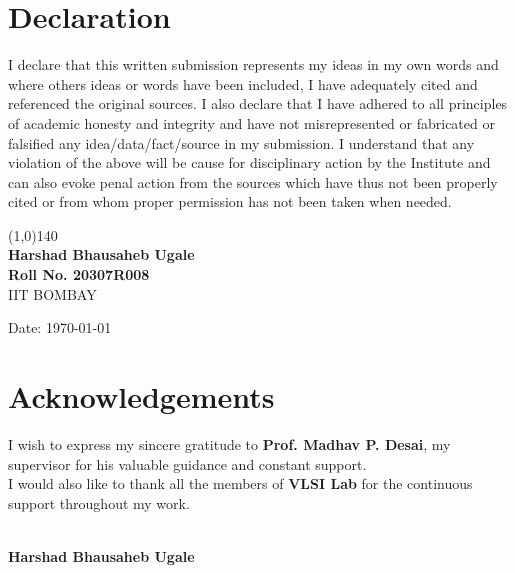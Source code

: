 \documentclass[a4paper,11pt, final]{report}
\begin{document}
\newpage
{}
 \linespread{1.5}
\chapter*{Declaration}
I declare that this written submission represents my ideas in my own words and where others ideas or words have been included, I have adequately cited and referenced the original sources. 
\newline
\newline
I also declare that I have adhered to all principles of academic honesty and integrity and have not misrepresented or fabricated or falsified any idea/data/fact/source in my submission. I understand that any violation of the above will be cause for disciplinary action by the Institute and can also evoke penal action from the sources which have thus not been  properly cited or from whom proper permission has not been taken when needed.

\vspace{3.0cm}
\begin{flushright}
\line(1,0){140}\\
\vspace*{10pt}
\textbf{Harshad Bhausaheb Ugale} \\
\textbf{Roll No. 20307R008} \\
IIT BOMBAY
\end{flushright}
\begin{flushleft}

Date: \today
\end{flushleft}


 
 \newpage
\chapter*{Acknowledgements}
I wish to express my sincere gratitude to \textbf{Prof. Madhav P. Desai}, my supervisor for his valuable guidance and constant support.\\
I would also like to thank all the members of \textbf{VLSI Lab} for the continuous support throughout my work.\\
\\
\vspace*{0pt}
\begin{flushright}
\textbf{Harshad Bhausaheb Ugale}
\end{flushright}

\newpage
\end{document}
